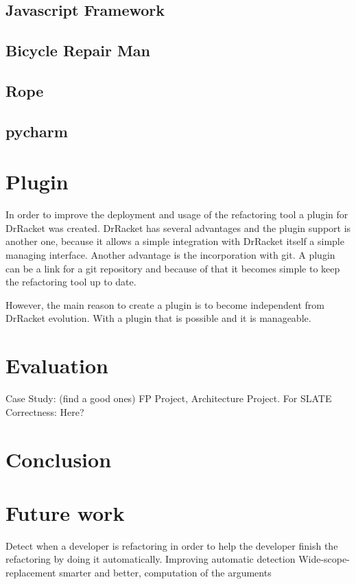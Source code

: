 \subsection{Javascript Framework}
\subsection{Bicycle Repair Man}
\subsection{Rope}
\subsection{pycharm}

\section{Plugin}
In order to improve the deployment and usage of the refactoring tool a plugin
for DrRacket was created.
DrRacket has several advantages and the plugin support is another one, because
it allows a simple integration with DrRacket itself a simple managing interface.
Another advantage is the incorporation with git. A plugin can be a link for a git
repository and because of that it becomes simple to keep the refactoring tool up to date.

However, the main reason to create a plugin is to become independent from DrRacket
evolution. With a plugin that is possible and it is manageable.


\section{Evaluation}
Case Study: (find a good ones) FP Project, Architecture Project. For SLATE
Correctness: Here?
\section{Conclusion}

\section{Future work}
Detect when a developer is refactoring in order to help the developer finish the
refactoring by doing it automatically.
Improving automatic detection
Wide-scope-replacement smarter and better, computation of the arguments
